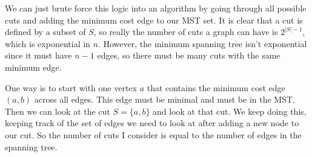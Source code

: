 \documentclass{article}
\begin{document}
      We can just brute force this logic into an algorithm by going through all possible cuts and adding the minimum cost edge to our MST set. It is clear that a cut is defined by a subset of $S$, so really the number of cuts a graph can have is $2^{|S| - 1}$, which is exponential in $n$. However, the minimum spanning tree isn't exponential since it must have $n-1$ edges, so there must be many cuts with the same minimum edge. 

      One way is to start with one vertex $a$ that contains the minimum cost edge $(a, b)$ across all edges.  This edge must be minimal and must be in the MST. Then we can look at the cut $S = \{a, b\}$ and look at that cut. We keep doing this, keeping track of the set of edges we need to look at after adding a new node to our cut. So the number of cuts I consider is equal to the number of edges in the spanning tree.
\end{document}

